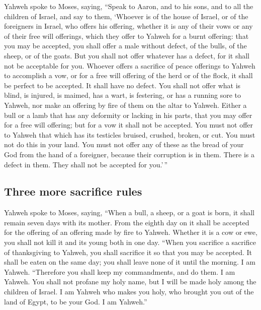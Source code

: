 \begin{paracol}{2}
\begin{otherlanguage}{english}
 Yahweh spoke to Moses, saying,  ``Speak
to Aaron, and to his sons, and to all the children of Israel, and say to
them, `Whoever is of the house of Israel, or of the foreigners in
Israel, who offers his offering, whether it is any of their vows or any
of their free will offerings, which they offer to Yahweh for a burnt
offering:  that you may be accepted, you shall offer a
male without defect, of the bulls, of the sheep, or of the goats.
 But you shall not offer whatever has a defect, for it
shall not be acceptable for you.  Whoever offers a
sacrifice of peace offerings to Yahweh to accomplish a vow, or for a
free will offering of the herd or of the flock, it shall be perfect to
be accepted. It shall have no defect.  You shall not
offer what is blind, is injured, is maimed, has a wart, is festering, or
has a running sore to Yahweh, nor make an offering by fire of them on
the altar to Yahweh.  Either a bull or a lamb that has
any deformity or lacking in his parts, that you may offer for a free
will offering; but for a vow it shall not be accepted. 
You must not offer to Yahweh that which has its testicles bruised,
crushed, broken, or cut. You must not do this in your land.
 You must not offer any of these as the bread of your God
from the hand of a foreigner, because their corruption is in them. There
is a defect in them. They shall not be accepted for you.'\,''

\hypertarget{three-more-sacrifice-rules}{%
\subsection{Three more sacrifice
rules}\label{three-more-sacrifice-rules}}

 Yahweh spoke to Moses, saying,  ``When a
bull, a sheep, or a goat is born, it shall remain seven days with its
mother. From the eighth day on it shall be accepted for the offering of
an offering made by fire to Yahweh.  Whether it is a cow
or ewe, you shall not kill it and its young both in one day.
 ``When you sacrifice a sacrifice of thanksgiving to
Yahweh, you shall sacrifice it so that you may be accepted.
 It shall be eaten on the same day; you shall leave none
of it until the morning. I am Yahweh.  ``Therefore you
shall keep my commandments, and do them. I am Yahweh. 
You shall not profane my holy name, but I will be made holy among the
children of Israel. I am Yahweh who makes you holy,  who
brought you out of the land of Egypt, to be your God. I am Yahweh.''


\end{otherlanguage}
\end{paracol}
